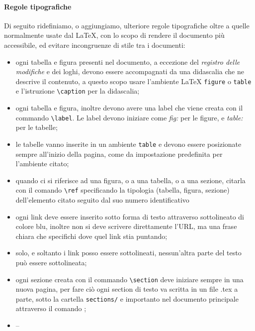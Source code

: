         \paragraph{Regole tipografiche}
            Di seguito ridefiniamo, o aggiungiamo, ulteriore regole tipografiche oltre a quelle normalmente usate dal \LaTeX, con lo scopo di rendere il documento più accessibile, ed evitare incongruenze di stile tra i documenti:
            \begin{itemize}
                \item ogni tabella e figura presenti nel documento, a eccezione del \emph{registro delle modifiche} e dei loghi, devono essere accompagnati da una didascalia che ne descrive il contenuto, a questo scopo usare l'ambiente LaTeX \verb|figure| o \verb|table| e l'istruzione \verb|\caption| per la didascalia;
                \item ogni tabella e figura, inoltre devono avere una label che viene creata con il commando \verb|\label|. Le label devono iniziare come \emph{fig:} per le figure, e \emph{table:} per le tabelle;
                \item le tabelle vanno inserite in un ambiente \verb|table| e devono essere posizionate sempre all'inizio della pagina, come da impostazione predefinita per l'ambiente citato;
                \item quando ci si riferisce ad una figura, o a una tabella, o a una sezione, citarla con il comando \verb|\ref| specificando la tipologia (tabella, figura, sezione) dell'elemento citato seguito dal suo numero identificativo
                \item ogni link deve essere inserito sotto forma di testo attraverso sottolineato di colore blu, inoltre non si deve scrivere direttamente l'URL, ma una frase chiara che specifichi dove quel link stia puntando;
                \item solo, e soltanto i link posso essere sottolineati, nessun'altra parte del testo può essere sottolineata;
                \item ogni sezione creata con il commando \verb|\section| deve iniziare sempre in una nuova pagina, per fare ciò ogni section di testo va scritta in un file .tex a parte, sotto la cartella \verb|sections/| e importanto nel documento principale attraverso il comando \verb||;
                \item --
            \end{itemize}

